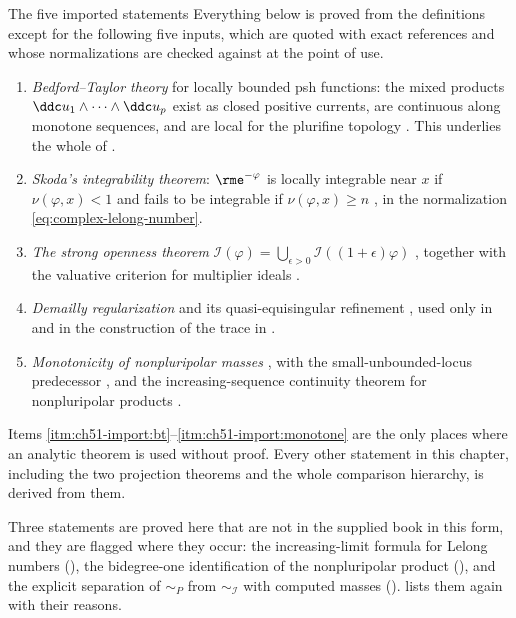\begin{important}{The five imported statements}
\label{imp:ch51-imported}
Everything below is proved from the definitions except for the following
five inputs, which are quoted with exact references and whose
normalizations are checked against  at the
point of use.
\begin{enumerate}
\item\label{itm:ch51-import:bt}
      \emph{Bedford--Taylor theory} for locally bounded psh functions:
      the mixed products \(\ddc u_1\wedge\cdots\wedge\ddc u_p\) exist as
      closed positive currents, are continuous along monotone sequences,
      and are local for the plurifine topology
      \cite{BT76,BT82}.  This underlies the whole of
      .
\item\label{itm:ch51-import:skoda}
      \emph{Skoda's integrability theorem}: \(\rme^{-\varphi}\) is locally
      integrable near \(x\) if \(\nu(\varphi,x)<1\) and fails to be
      integrable if \(\nu(\varphi,x)\geq n\) \cite{Sko72}, in the
      normalization \eqref{eq:complex-lelong-number}.
\item\label{itm:ch51-import:openness}
      \emph{The strong openness theorem}
      \(\mathcal I(\varphi)=\bigcup_{\epsilon>0}\mathcal I((1+\epsilon)\varphi)\)
      \cite[Theorem~1.1]{GZ15}, together with the valuative criterion for
      multiplier ideals \cite[Corollary~10.18]{Bou17}.
\item\label{itm:ch51-import:regularization}
      \emph{Demailly regularization} and its quasi-equisingular refinement
      \cite{Dem92reg,DPS01}, used only in
       and in the construction of
      the trace in .
\item\label{itm:ch51-import:monotone}
      \emph{Monotonicity of nonpluripolar masses}
      \cite[Theorem~1.1]{DDNL18mono}, with the small-unbounded-locus
      predecessor \cite[Theorem~1.16]{BEGZ10}, and the increasing-sequence
      continuity theorem for nonpluripolar products
      \cite[Theorem~2.3]{DDNL18mono}.
\end{enumerate}
Items \cref{itm:ch51-import:bt}--\cref{itm:ch51-import:monotone} are the
only places where an analytic theorem is used without proof.  Every other
statement in this chapter, including the two projection theorems and the
whole comparison hierarchy, is derived from them.
\end{important}

Three statements are proved here that are not in the supplied book in this
form, and they are flagged where they occur: the increasing-limit formula
for Lelong numbers (), the bidegree-one
identification of the nonpluripolar product
(), and the explicit separation of
\(\sim_P\) from \(\sim_{\mathcal I}\) with computed masses
().   lists them again with
their reasons.

